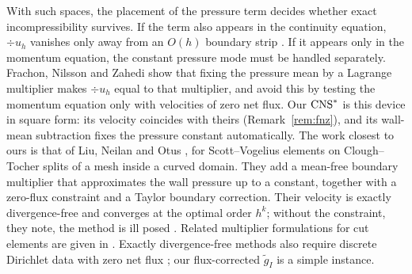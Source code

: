 With such spaces, the placement of the pressure term decides whether exact incompressibility survives. If the term also appears in the continuity equation, $\div u_h$ vanishes only away from an $O(h)$ boundary strip \cite{LiuNeilanOlshanskii2023}. If it appears only in the momentum equation, the constant pressure mode must be handled separately. Frachon, Nilsson and Zahedi \cite{FrachonNilssonZahedi2024} show that fixing the pressure mean by a Lagrange multiplier makes $\div u_h$ equal to that multiplier, and avoid this by testing the momentum equation only with velocities of zero net flux. Our $\mathrm{CNS}^\ast$ is this device in square form: its velocity coincides with theirs (Remark~\ref{rem:fnz}), and its wall-mean subtraction fixes the pressure constant automatically. The work closest to ours is that of Liu, Neilan and Otus \cite{LiuNeilanOtus2023}, for Scott--Vogelius elements on Clough--Tocher splits of a mesh inside a curved domain. They add a mean-free boundary multiplier that approximates the wall pressure up to a constant, together with a zero-flux constraint and a Taylor boundary correction. Their velocity is exactly divergence-free and converges at the optimal order $h^k$; without the constraint, they note, the method is ill posed \cite[Remark~3.2]{LiuNeilanOtus2023}. Related multiplier formulations for cut elements are given in \cite{BurmanHansboLarson2024}. Exactly divergence-free methods also require discrete Dirichlet data with zero net flux \cite{EickmannScottTscherpel2025}; our flux-corrected $\tilde g_I$ is a simple instance.

